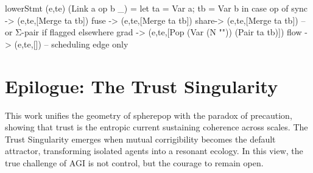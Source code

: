 \documentclass[12pt,a4paper]{article}
\theoremstyle{definition}
\theoremstyle{plain}
\begin{document}
lowerStmt (e,te) (Link a op b _) =
  let ta = Var a; tb = Var b in
  case op of
    sync -> (e,te,[Merge ta tb])
    fuse -> (e,te,[Merge ta tb])
    share-> (e,te,[Merge ta tb]) -- or Σ-pair if flagged elsewhere
    grad -> (e,te,[Pop (Var (N "\nabla")) (Pair ta tb)])
    flow -> (e,te,[]) -- scheduling edge only

\section*{Epilogue: The Trust Singularity}

This work unifies the geometry of spherepop with the paradox of precaution, showing that trust is the entropic current sustaining coherence across scales. The Trust Singularity emerges when mutual corrigibility becomes the default attractor, transforming isolated agents into a resonant ecology. In this view, the true challenge of AGI is not control, but the courage to remain open.

\end{document}
